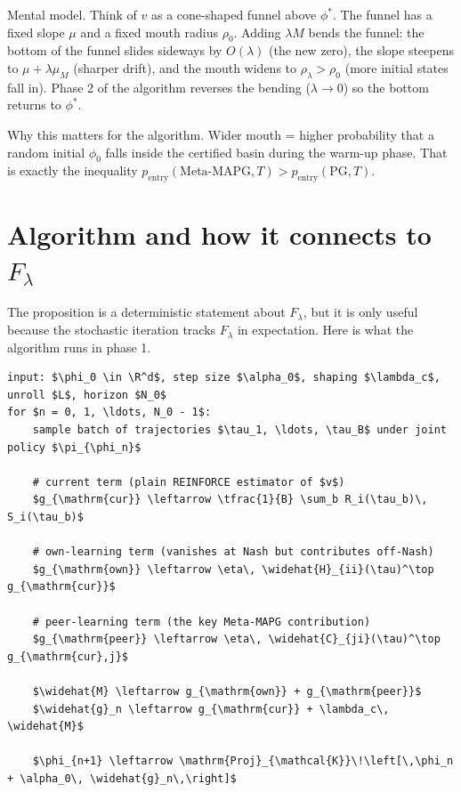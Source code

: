 \documentclass[11pt]{article}
\newcommand{\R}{\mathbb{R}}
\begin{document}
Mental model. Think of $v$ as a cone-shaped funnel above $\phi^*$. The funnel has a fixed slope $\mu$ and a fixed mouth radius $\rho_0$. Adding $\lambda M$ bends the funnel: the bottom of the funnel slides sideways by $O(\lambda)$ (the new zero), the slope steepens to $\mu + \lambda \mu_M$ (sharper drift), and the mouth widens to $\rho_\lambda > \rho_0$ (more initial states fall in). Phase 2 of the algorithm reverses the bending ($\lambda \to 0$) so the bottom returns to $\phi^*$.

Why this matters for the algorithm. Wider mouth = higher probability that a random initial $\phi_0$ falls inside the certified basin during the warm-up phase. That is exactly the inequality $p_{\mathrm{entry}}(\text{Meta-MAPG}, T) > p_{\mathrm{entry}}(\text{PG}, T)$.

\section{Algorithm and how it connects to $F_\lambda$}\label{sec:algorithm}

The proposition is a deterministic statement about $F_\lambda$, but it is only useful because the stochastic iteration tracks $F_\lambda$ in expectation. Here is what the algorithm runs in phase 1.

\begin{lstlisting}[basicstyle=\small\ttfamily, mathescape=true, frame=single, xleftmargin=8pt]
input: $\phi_0 \in \R^d$, step size $\alpha_0$, shaping $\lambda_c$, unroll $L$, horizon $N_0$
for $n = 0, 1, \ldots, N_0 - 1$:
    sample batch of trajectories $\tau_1, \ldots, \tau_B$ under joint policy $\pi_{\phi_n}$

    # current term (plain REINFORCE estimator of $v$)
    $g_{\mathrm{cur}} \leftarrow \tfrac{1}{B} \sum_b R_i(\tau_b)\, S_i(\tau_b)$

    # own-learning term (vanishes at Nash but contributes off-Nash)
    $g_{\mathrm{own}} \leftarrow \eta\, \widehat{H}_{ii}(\tau)^\top g_{\mathrm{cur}}$

    # peer-learning term (the key Meta-MAPG contribution)
    $g_{\mathrm{peer}} \leftarrow \eta\, \widehat{C}_{ji}(\tau)^\top g_{\mathrm{cur},j}$

    $\widehat{M} \leftarrow g_{\mathrm{own}} + g_{\mathrm{peer}}$
    $\widehat{g}_n \leftarrow g_{\mathrm{cur}} + \lambda_c\, \widehat{M}$

    $\phi_{n+1} \leftarrow \mathrm{Proj}_{\mathcal{K}}\!\left[\,\phi_n + \alpha_0\, \widehat{g}_n\,\right]$
\end{lstlisting}
\end{document}
